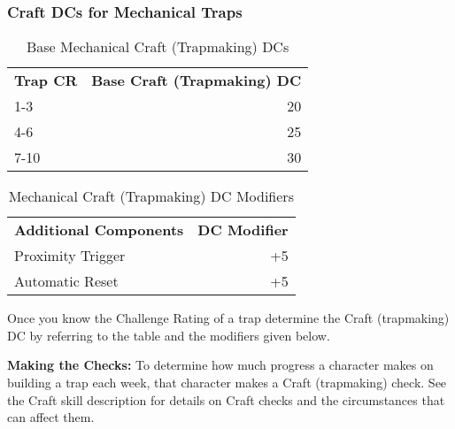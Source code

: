\subsubsection{Craft DCs for Mechanical Traps}

\begin{table}[htb]
\caption{Base Mechanical Craft (Trapmaking) DCs}
\centering
\begin{tabular}{l r}
\textbf{Trap CR} & \textbf{Base Craft (Trapmaking) DC}\\
1-3 & 20\\
4-6 & 25\\
7-10 & 30\\
\end{tabular}
\end{table}

\begin{table}[htb]
\caption{Mechanical Craft (Trapmaking) DC Modifiers}
\centering
\begin{tabular}{l r}
\textbf{Additional Components} & \textbf{DC Modifier}\\
Proximity Trigger & +5\\
Automatic Reset & +5\\
\end{tabular}
\end{table}

Once you know the Challenge Rating of a trap determine the Craft (trapmaking) DC 
by referring to the table and the modifiers given below.

\textbf{Making the Checks:} To determine how much progress a character makes on 
building a trap each week, that character makes a Craft (trapmaking) check. See 
the Craft skill description for details on Craft checks and the circumstances that 
can affect them.


